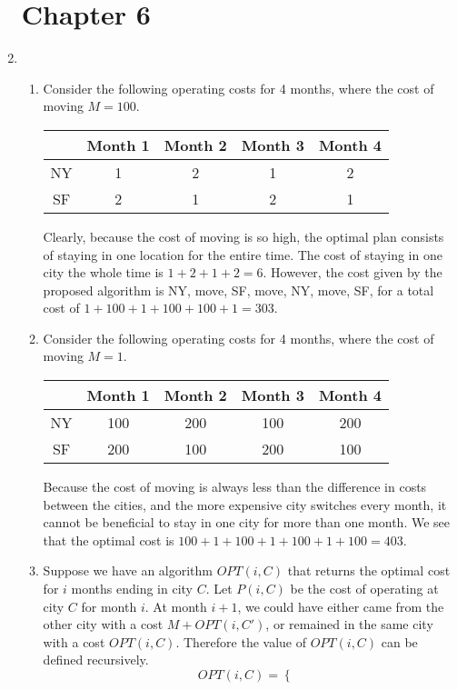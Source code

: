 \documentclass[oneside, 12pt]{article}
\begin{document}
\begin{enumerate}
\section*{Chapter 6}
\item
\begin{enumerate}
\item 
Consider the following operating costs for 4 months, where the cost of moving $M = 100$.
\begin{table}[htb]
\centering
\begin{tabular}{c | c c c  c}
& Month 1 & Month 2 & Month 3 & Month 4 \\
\hline
NY & 1 & 2 & 1 & 2\\
SF & 2 & 1 & 2 & 1\\
\end{tabular}
\end{table}
Clearly, because the cost of moving is so high, the optimal plan consists of staying in one location for the entire time. The cost of staying in one city the whole time is $1 + 2 + 1 + 2 = 6$. However, the cost given by the proposed algorithm is NY, move, SF, move, NY, move, SF, for a total cost of $1 + 100 + 1 + 100 + 100 + 1 = 303$. 
\item
Consider the following operating costs for 4 months, where the cost of moving $M = 1$.
\begin{table}[htb]
\centering
\begin{tabular}{c | c c c  c}
& Month 1 & Month 2 & Month 3 & Month 4 \\
\hline
NY & 100 & 200 & 100 & 200\\
SF & 200 & 100 & 200 & 100\\
\end{tabular}
\end{table}
Because the cost of moving is always less than the difference in costs between the cities, and the more expensive city switches every month, it cannot be beneficial to stay in one city for more than one month. We see that the optimal cost is $100 + 1 + 100 + 1 + 100 + 1 + 100 = 403$.
\item 
Suppose we have an algorithm $OPT(i, C)$ that returns the optimal cost for $i$ months ending in city $C$. Let $P(i, C)$ be the cost of operating at city $C$ for month $i$. At month $i+1$, we could have either came from the other city with a cost $M + OPT(i, C')$, or remained in the same city with a cost $OPT(i, C)$. Therefore the value of $OPT(i, C)$ can be defined recursively.  
\[
OPT(i, C) = 
\begin{cases}

\end{cases}\]
\end{enumerate}
\end{enumerate}
\end{document}
